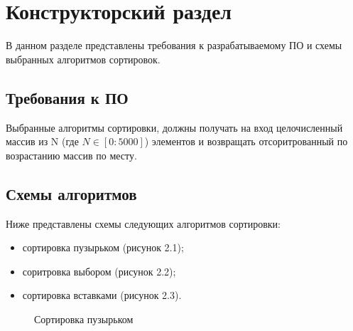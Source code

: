\chapter{Конструкторский раздел}
В данном разделе представлены требования к разрабатываемому ПО и схемы выбранных алгоритмов сортировок.


\section{Требования к ПО}
Выбранные алгоритмы сортировки, должны получать на вход целочисленный массив из N (где $N\in[0:5000]$) элементов и возвращать отсоритрованный по возрастанию массив по месту.


\section{Схемы алгоритмов}
Ниже представлены схемы следующих алгоритмов сортировки:
\begin{itemize}
	\item сортировка пузырьком (рисунок 2.1);
	\item соритровка выбором (рисунок 2.2);
	\item сортировка вставками (рисунок 2.3).
\end{itemize}

\begin{figure}
	\caption{Сортировка пузырьком}
\end{figure}

